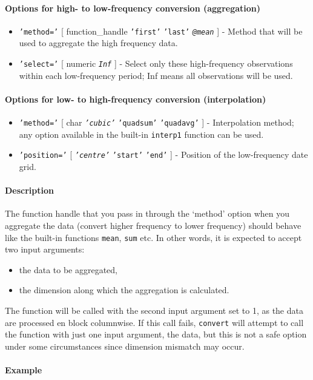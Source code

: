  \paragraph{Options for high- to low-frequency conversion (aggregation)}
 
 \begin{itemize}
 \item
   \texttt{'method='} {[} function\_handle \textbar{} \texttt{'first'}
   \textbar{} \texttt{'last'} \textbar{} \emph{\texttt{@mean}} {]} -
   Method that will be used to aggregate the high frequency data.
 \item
   \texttt{'select='} {[} numeric \textbar{} \emph{\texttt{Inf}} {]} -
   Select only these high-frequency observations within each
   low-frequency period; Inf means all observations will be used.
 \end{itemize}
 
 \paragraph{Options for low- to high-frequency conversion
 (interpolation)}
 
 \begin{itemize}
 \item
   \texttt{'method='} {[} char \textbar{} \emph{\texttt{'cubic'}}
   \textbar{} \texttt{'quadsum'} \textbar{} \texttt{'quadavg'} {]} -
   Interpolation method; any option available in the built-in
   \texttt{interp1} function can be used.
 \item
   \texttt{'position='} {[} \emph{\texttt{'centre'}} \textbar{}
   \texttt{'start'} \textbar{} \texttt{'end'} {]} - Position of the
   low-frequency date grid.
 \end{itemize}
 
 \paragraph{Description}
 
 The function handle that you pass in through the `method' option when
 you aggregate the data (convert higher frequency to lower frequency)
 should behave like the built-in functions \texttt{mean}, \texttt{sum}
 etc. In other words, it is expected to accept two input arguments:
 
 \begin{itemize}
 \item
   the data to be aggregated,
 \item
   the dimension along which the aggregation is calculated.
 \end{itemize}
 
 The function will be called with the second input argument set to 1, as
 the data are processed en block columnwise. If this call fails,
 \texttt{convert} will attempt to call the function with just one input
 argument, the data, but this is not a safe option under some
 circumstances since dimension mismatch may occur.
 
 \paragraph{Example}



